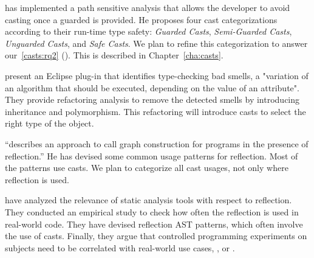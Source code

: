 \cite{wintherGuardedTypePromotion2011} has implemented a
path sensitive analysis that allows the developer to avoid casting
once a guarded  is provided.
He proposes four cast categorizations according to their
run-time type safety:
\emph{Guarded Casts}, \emph{Semi-Guarded Casts},
\emph{Unguarded Casts}, and \emph{Safe Casts}.
We plan to refine this categorization to answer
our~\ref{casts:rq2} (\emph{\crqB}).
This is described in Chapter~\ref{cha:casts}.

\cite{tsantalisJDeodorantIdentificationRemoval2008} present an
Eclipse plug-in that identifies type-checking bad smells,
a "variation of an algorithm that should be executed,
depending on the value of an attribute".
They provide refactoring analysis to remove the detected smells
by introducing inheritance and polymorphism.
This refactoring will introduce casts to select
the right type of the object.

\cite{livshitsImprovingSoftwareSecurity2006,livshitsReflectionAnalysisJava2005} ``describes an approach to call graph construction for \java{} programs in the presence of reflection.''
He has devised some common usage patterns for reflection.
Most of the patterns use casts.
We plan to categorize all cast usages,
not only where reflection is used.

\cite{landmanChallengesStaticAnalysis2017} have analyzed the relevance of
static analysis tools with respect to reflection.
They conducted an empirical study to check how often the reflection
\api{} is used in real-world code.
They have devised reflection AST patterns,
which often involve the use of casts.
Finally, they argue that controlled programming experiments on
subjects need to be correlated with real-world use cases,
\eg, \github{} or \mavencentral{}.

